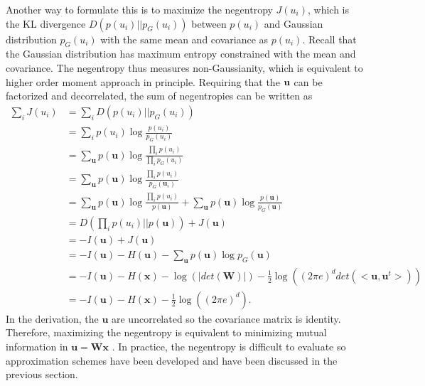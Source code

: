 \documentclass[aps,prl,preprint,superscriptaddress]{revtex4-2}
\begin{document}
Another way to formulate this is to maximize the negentropy $J(u_{i})$, which is the KL divergence $D(p(u_{i})||p_{G}(u_{i}))$ between $p(u_{i})$ and Gaussian distribution $p_{G}(u_{i})$ with the same mean and covariance as $p(u_{i})$. Recall that the Gaussian distribution has maximum entropy constrained with the mean and covariance. The negentropy thus measures non-Gaussianity, which is equivalent to higher order moment approach in principle. Requiring that the $\bf{u}$ can be factorized and decorrelated, the sum of negentropies can be written as 
\begin{align}
\sum_{i}J(u_{i}) &= \sum_{i}D(p(u_{i})||p_{G}(u_{i})) \\
&= \sum_{i}p(u_{i})\log\frac{p(u_{i})}{p_{G}(u_{i})} \\
&= \sum_{\mathbf{u}}p(\mathbf{u}) \log\frac{\prod_{i}p(u_{i})}{\prod_{i}p_{G}(u_{i})} \\
&= \sum_{\mathbf{u}}p(\mathbf{u}) \log\frac{\prod_{i}p(u_{i})}{p_{G}(\mathbf{u}_{i})} \\
&= \sum_{\mathbf{u}}p(\mathbf{u}) \log\frac{\prod_{i}p(u_{i})}{p(\mathbf{u})} + \sum_{\mathbf{u}}p(\mathbf{u})\log\frac{p(\mathbf{u})}{p_{G}(\mathbf{u})} \\
&= D(\prod_{i}p(u_{i})||p(\mathbf{u})) + J(\mathbf{u}) \\
&= -I(\mathbf{u}) + J(\mathbf{u}) \\
& = -I(\mathbf{u}) - H(\mathbf{u}) - \sum_{\mathbf{u}}p(\mathbf{u})\log p_{G}(\mathbf{u}) \\
& = -I(\mathbf{u}) - H(\mathbf{x}) - \log(|det(\mathbf{W})|) - \frac{1}{2}\log((2\pi e)^{d}det(<\mathbf{u}, \mathbf{u}^{t}>))\\
&= -I(\mathbf{u}) - H(\mathbf{x}) - \frac{1}{2}\log((2\pi e)^{d}).
\end{align} In the derivation, the $\mathbf{u}$ are uncorrelated so the covariance matrix is identity. Therefore, maximizing the negentropy is equivalent to minimizing mutual information in $\mathbf{u} = \mathbf{W}\mathbf{x}$ \cite{lee1998independent}. In practice, the negentropy is difficult to evaluate so approximation schemes have been developed and have been discussed in the previous section. 
\end{document}
